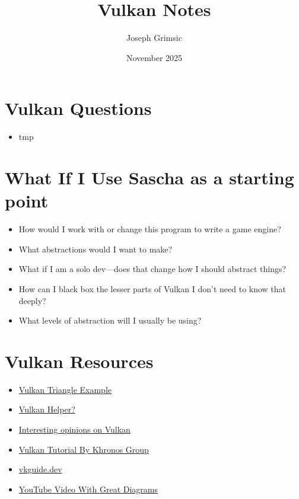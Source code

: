 \documentclass{article}
\title{Vulkan Notes}
\author{Joseph Grimsic}
\date{November 2025}
\begin{document}
\maketitle

\tableofcontents

\newpage %

\section*{Vulkan Questions}
\begin{itemize}
  \item tmp
\end{itemize}

\section*{What If I Use Sascha as a starting point}
\begin{itemize}
  \item How would I work with or change this program to write a game engine?
  \item What abstractions would I want to make?
  \item What if I am a solo dev—does that change how I should abstract things?
  \item How can I black box the lesser parts of Vulkan I don't need
    to know that deeply?
  \item What levels of abstraction will I usually be using?
\end{itemize}

\section*{Vulkan Resources}
\begin{itemize}
  \item
    \href{https://github.com/SaschaWillems/Vulkan/blob/master/examples/triangle/triangle.cpp}{Vulkan
    Triangle Example}
  \item \href{https://github.com/KhronosGroup/Vulkan-Hpp}{Vulkan Helper?}

  \item
    \href{https://www.reddit.com/r/GraphicsProgramming/comments/tc9d2u/the_current_state_of_gpu_apis_and_why_i_wish_vez/}{Interesting
    opinions on Vulkan}

  \item
    \href{https://docs.vulkan.org/tutorial/latest/00_Introduction.html}{Vulkan
    Tutorial By Khronos Group}
  \item \href{https://vkguide.dev/}{vkguide.dev}
  \item
    \href{https://www.youtube.com/watch?v=2NVlG9TFT1c&t=202s}{YouTube
    Video With Great Diagrams}
\end{itemize}
\end{document}
